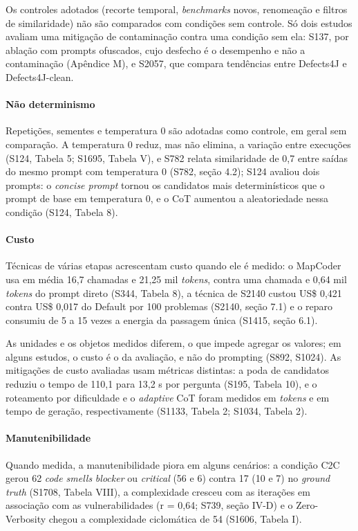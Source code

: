 Os controles adotados (recorte temporal, \textit{benchmarks} novos, renomeação e filtros de similaridade) não são comparados com condições sem controle.
Só dois estudos avaliam uma mitigação de contaminação contra uma condição sem ela: S137, por ablação com prompts ofuscados, cujo desfecho é o desempenho e não a contaminação (Apêndice M), e S2057, que compara tendências entre Defects4J e Defects4J-clean.

\paragraph{Não determinismo}
Repetições, sementes e temperatura 0 são adotadas como controle, em geral sem comparação.
A temperatura 0 reduz, mas não elimina, a variação entre execuções (S124, Tabela 5; S1695, Tabela V), e S782 relata similaridade de 0,7 entre saídas do mesmo prompt com temperatura 0 (S782, seção 4.2); S124 avaliou dois prompts: o \textit{concise prompt} tornou os candidatos mais determinísticos que o prompt de base em temperatura 0, e o CoT aumentou a aleatoriedade nessa condição (S124, Tabela 8).

\paragraph{Custo}
Técnicas de várias etapas acrescentam custo quando ele é medido: o MapCoder usa em média 16,7 chamadas e 21,25 mil \textit{tokens}, contra uma chamada e 0,64 mil \textit{tokens} do prompt direto (S344, Tabela 8), a técnica de S2140 custou US\$ 0,421 contra US\$ 0,017 do Default por 100 problemas (S2140, seção 7.1) e o reparo consumiu de 5 a 15 vezes a energia da passagem única (S1415, seção 6.1).

As unidades e os objetos medidos diferem, o que impede agregar os valores; em alguns estudos, o custo é o da avaliação, e não do prompting (S892, S1024).
As mitigações de custo avaliadas usam métricas distintas: a poda de candidatos reduziu o tempo de 110,1 para 13,2 s por pergunta (S195, Tabela 10), e o roteamento por dificuldade e o \textit{adaptive} CoT foram medidos em \textit{tokens} e em tempo de geração, respectivamente (S1133, Tabela 2; S1034, Tabela 2).

\paragraph{Manutenibilidade}
Quando medida, a manutenibilidade piora em alguns cenários: a condição C2C gerou 62 \textit{code smells} \textit{blocker} ou \textit{critical} (56 e 6) contra 17 (10 e 7) no \textit{ground truth} (S1708, Tabela VIII), a complexidade cresceu com as iterações em associação com as vulnerabilidades (r = 0,64; S739, seção IV-D) e o Zero-Verbosity chegou a complexidade ciclomática de 54 (S1606, Tabela I).

